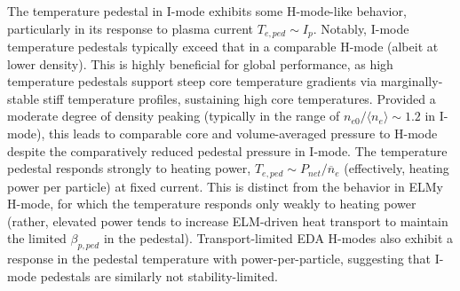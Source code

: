 \documentclass[ twoside,openright,titlepage,numbers=noenddot,headinclude,%
                footinclude=true,cleardoublepage=empty,abstractoff, %
                BCOR=5mm,paper=letter,fontsize=11pt,%
                ngerman,american,%
                ]{scrreprt}
\begin{document}
The temperature pedestal in I-mode exhibits some H-mode-like behavior, particularly in its response to plasma current $T_{e,ped} \sim I_p$.  Notably, I-mode temperature pedestals typically exceed that in a comparable H-mode (albeit at lower density).  This is highly beneficial for global performance, as high temperature pedestals support steep core temperature gradients via marginally-stable stiff temperature profiles, sustaining high core temperatures.  Provided a moderate degree of density peaking (typically in the range of $n_{e0}/\langle n_e \rangle \sim 1.2$ in I-mode), this leads to comparable core and volume-averaged pressure to H-mode despite the comparatively reduced pedestal pressure in I-mode.  The temperature pedestal responds strongly to heating power, $T_{e,ped} \sim P_{net}/\overline{n}_e$ (effectively, heating power per particle) at fixed current.  This is distinct from the behavior in ELMy H-mode, for which the temperature responds only weakly to heating power (rather, elevated power tends to increase ELM-driven heat transport to maintain the limited $\beta_{p,ped}$ in the pedestal).  Transport-limited EDA H-modes also exhibit a response in the pedestal temperature with power-per-particle, suggesting that I-mode pedestals are similarly not stability-limited.

\end{document}
